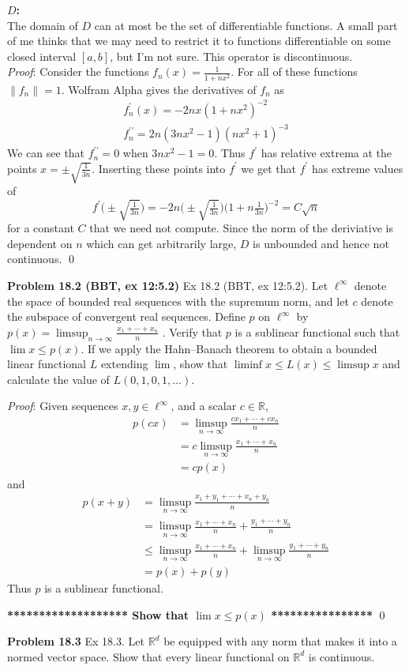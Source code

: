 \documentclass[12pt]{article}
\newcommand{\problem}[1]{\hspace{-4 ex} \large \textbf{Problem #1} }
\newcommand{\norm}[1]{\left\lVert#1\right\rVert}
\renewenvironment{proof}{\hspace{-4 ex} \emph{Proof}:}{\qed}
\newcommand{\RR}{\mathbb{R}}
\begin{document}
	\textbf{$D$:}\\
	The domain of $D$ can at most be the set of differentiable functions. A small part of me thinks that we may need to restrict it to functions differentiable on some closed interval $[a,b]$, but I'm not sure. This operator is discontinuous. \\
	\begin{proof}
		Consider the functions $f_n(x) = \frac{1}{1+nx^2}$. For all of these functions $\norm{f_n} = 1$. Wolfram Alpha gives the derivatives of $f_n$ as 
		\begin{align*}
			f_n^\prime(x) = -2nx(1+nx^2)^{-2} \\
			f_n^{\prime\prime} = 2n(3nx^2-1)(nx^2+1)^{-3}
		\end{align*} 
		We can see that $f_n^{\prime\prime} = 0$ when $3nx^2-1 = 0$. Thus $f^\prime$ has relative extrema at the points $x = \pm \sqrt{\frac{1}{3n}}$. Inserting these points into $f^\prime$ we get that $f^\prime$ has extreme values of
		$$
		f^\prime \Big(\pm \sqrt{\tfrac{1}{3n}} \Big) = -2n \Big(\pm \sqrt{\tfrac{1}{3n}} \Big) \Big(1+n\tfrac{1}{3n} \Big)^{-2} = C\sqrt{n}
		$$
		for a constant $C$ that we need not compute. Since the norm of the deriviative is dependent on $n$ which can get arbitrarily large, $D$ is unbounded and hence not continuous.
	\end{proof}

\problem{18.2 (BBT, ex 12:5.2)}
Ex 18.2 (BBT, ex 12:5.2). Let $\ell^\infty$ denote the space of bounded real sequences with the supremum norm, and let $c$ denote the subspace of convergent real sequences. Define $p$ on $\ell^\infty$ by
$p(x)=\limsup_{n\to\infty}\frac{x_1+\cdots+x_n}{n}$ .
Verify that $p$ is a sublinear functional such that $\lim x\leq p(x)$. If we apply the Hahn--Banach theorem to obtain a bounded linear functional $L$ extending $\lim$, show that $\liminf x\leq L(x)\leq\limsup x$ and calculate the value of $L(0,1,0,1,\ldots)$.

	\begin{proof}
		Given sequences $x,y \in \ell^\infty$, and a scalar $c \in \RR$, 
		\begin{align*}
			p(cx) & = \limsup_{n\to\infty}\frac{cx_1+\cdots+cx_n}{n} \\
			& = c \limsup_{n\to\infty}\frac{x_1+\cdots+x_n}{n} \\
			& = cp(x)
		\end{align*}
		and
		\begin{align*}
			p(x+y) & = \limsup_{n\to\infty}\frac{x_1+y_1+\cdots+x_n+y_n}{n} \\
			& = \limsup_{n\to\infty}\frac{x_1+\cdots+x_n}{n} + \frac{y_1+\cdots+y_n}{n}\\
			& \leq \limsup_{n\to\infty}\frac{x_1+\cdots+x_n}{n} + \limsup_{n\to\infty} \frac{y_1+\cdots+y_n}{n}\\
			& = p(x) + p(y)
		\end{align*}
		Thus $p$ is a sublinear functional.
		
		\textbf{******************* Show that $\lim x \leq p(x)$ ****************}
	\end{proof}

\problem{18.3}
Ex 18.3. Let $\RR^d$ be equipped with any norm that makes it into a normed vector space. Show that every linear functional on $\RR^d$ is continuous.
\end{document}
